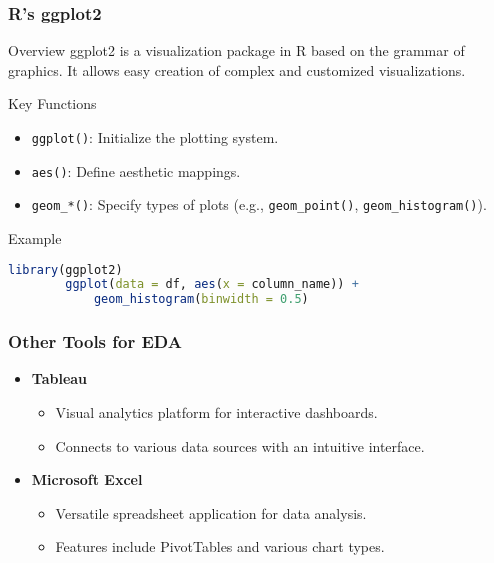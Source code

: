 \documentclass[aspectratio=169]{beamer}
\begin{document}
\begin{frame}[fragile]
    \frametitle{R's ggplot2}
    \begin{block}{Overview}
        ggplot2 is a visualization package in R based on the grammar of graphics.
        It allows easy creation of complex and customized visualizations.
    \end{block}
    \begin{block}{Key Functions}
        \begin{itemize}
            \item \texttt{ggplot()}: Initialize the plotting system.
            \item \texttt{aes()}: Define aesthetic mappings.
            \item \texttt{geom\_*()}: Specify types of plots (e.g., \texttt{geom\_point()}, \texttt{geom\_histogram()}).
        \end{itemize}
    \end{block}
    \begin{block}{Example}
        \begin{lstlisting}[language=R]
        library(ggplot2)
        ggplot(data = df, aes(x = column_name)) +
            geom_histogram(binwidth = 0.5)
        \end{lstlisting}
    \end{block}
\end{frame}

\begin{frame}
    \frametitle{Other Tools for EDA}
    \begin{itemize}
        \item \textbf{Tableau}
        \begin{itemize}
            \item Visual analytics platform for interactive dashboards.
            \item Connects to various data sources with an intuitive interface.
        \end{itemize}
        
        \item \textbf{Microsoft Excel}
        \begin{itemize}
            \item Versatile spreadsheet application for data analysis.
            \item Features include PivotTables and various chart types.
        \end{itemize}
    \end{itemize}
\end{frame}
\end{document}

